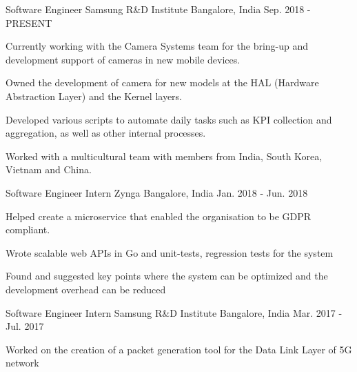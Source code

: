 

\begin{cventries}

  \cventry
    {Software Engineer} %
    {Samsung R\&D Institute} %
    {Bangalore, India} %
    {Sep. 2018 - PRESENT} %
    {
      \begin{cvitems} %
      \item {Currently working with the Camera Systems team for the bring-up and development support of cameras in new mobile devices.}
      \item {Owned the development of camera for new models at the HAL (Hardware Abstraction Layer) and the Kernel layers.}
      \item {Developed various scripts to automate daily tasks such as KPI collection and aggregation, as well as other internal processes. }
      \item {Worked with a multicultural team with members from India, South Korea, Vietnam and China.}
      \end{cvitems}
    }

  \cventry
    {Software Engineer Intern} %
    {Zynga} %
    {Bangalore, India} %
    {Jan. 2018 - Jun. 2018} %
    {
      \begin{cvitems} %
      \item {Helped create a microservice that enabled the organisation to be GDPR compliant.}
      \item {Wrote scalable web APIs in Go and unit-tests, regression tests for the system}
      \item {Found and suggested key points where the system can be optimized and the development overhead can be reduced}
      \end{cvitems}
    }

  \cventry
    {Software Engineer Intern} %
    {Samsung R\&D Institute} %
    {Bangalore, India} %
    {Mar. 2017 - Jul. 2017} %
    {
      \begin{cvitems} %
      \item {Worked on the creation of a packet generation tool for the Data Link Layer of 5G network }
      \end{cvitems}
    }


\end{cventries}
